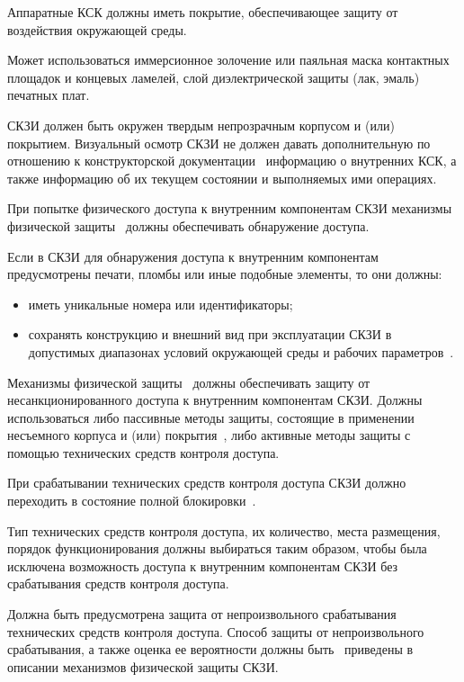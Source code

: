 \label{R.PS.Passivation}
Аппаратные КСК должны иметь покрытие, обеспечивающее защиту от воздействия 
окружающей среды. 

\begin{note}
Может использоваться иммерсионное золочение или паяльная маска контактных 
площадок и концевых ламелей, слой диэлектрической защиты (лак, эмаль) 
печатных плат.
\end{note}


\label{R.PS.Coating}
СКЗИ должен быть окружен твердым непрозрачным корпусом и (или) покрытием.
%
Визуальный осмотр СКЗИ не должен давать дополнительную по отношению 
к конструкторской документации~ информацию о внутренних 
КСК, а также информацию об их текущем состоянии и выполняемых ими 
операциях.


\label{R.PS.PassiveDetection}
При попытке физического доступа к внутренним компонентам СКЗИ механизмы 
физической защиты~ должны обеспечивать обнаружение доступа. 

\label{R.PS.PassiveDetectionId}
Если в СКЗИ для обнаружения доступа к внутренним компонентам предусмотрены 
печати, пломбы или иные подобные элементы, то они должны:
\begin{itemize}
\item
иметь уникальные номера или идентификаторы;
\item
сохранять конструкцию и внешний вид при эксплуатации СКЗИ в допустимых 
диапазонах условий окружающей среды и рабочих параметров~. 
\end{itemize}


\label{R.PS.ActiveDetectionSensor}
Механизмы физической защиты~ должны обеспечивать 
защиту от несанкционированного доступа к внутренним компонентам
СКЗИ. 
%
Должны использоваться либо пассивные методы защиты, состоящие в применении 
несъемного корпуса и (или) покрытия~, либо 
активные методы защиты с помощью технических средств контроля доступа.

\label{R.PS.Erasing}
При срабатывании технических средств контроля доступа СКЗИ должно 
переходить в состояние полной блокировки~.

\label{R.PS.SensorsQuality}
Тип технических средств контроля доступа, их количество, места 
размещения, порядок функционирования должны выбираться таким образом, 
чтобы была исключена возможность доступа к внутренним компонентам СКЗИ 
без срабатывания средств контроля доступа.  

\label{R.PS.SensorsFaults}
Должна быть предусмотрена защита от непроизвольного срабатывания технических 
средств контроля доступа. Способ защиты от непроизвольного срабатывания, 
а также оценка ее вероятности должны быть~ 
приведены в описании механизмов физической защиты СКЗИ.
